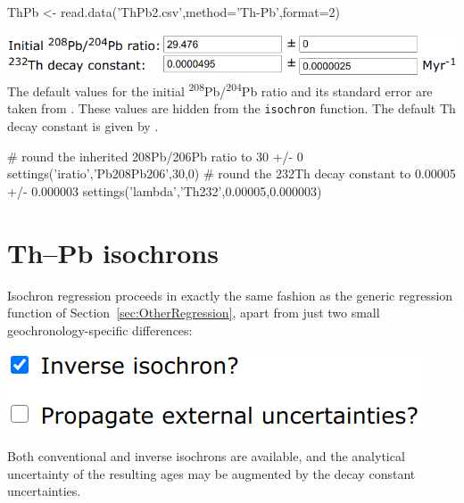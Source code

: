 \begin{refsection}
\begin{script}
ThPb <- read.data('ThPb2.csv',method='Th-Pb',format=2)
\end{script}

\noindent\includegraphics[width=.7\linewidth]{../figures/ThPbLambda.png}\\
\noindent The default values for the initial
\textsuperscript{208}Pb/\textsuperscript{204}Pb ratio and its standard
error are taken from \citet{stacey1975}. These values are hidden from
the \texttt{isochron} function. The default Th decay constant is given
by \citet{leroux1963}.

\begin{script}
# round the inherited 208Pb/206Pb ratio to 30 +/- 0
settings('iratio','Pb208Pb206',30,0) 
# round the 232Th decay constant to 0.00005 +/- 0.000003
settings('lambda','Th232',0.00005,0.000003) 
\end{script}

\section{Th--Pb isochrons}\label{sec:ThPb-isochrons-R}

Isochron regression proceeds in exactly the same fashion as the
generic regression function of Section~\ref{sec:OtherRegression},
apart from just two small geochronology-specific differences:\\

\noindent\begin{minipage}[t]{.35\linewidth}
\strut\vspace*{-\baselineskip}\newline
\includegraphics[width=\linewidth]{../figures/ThPbInverseExterr.png}
\end{minipage}
\begin{minipage}[t]{.65\linewidth}
Both conventional and inverse isochrons are available, and the
analytical uncertainty of the resulting ages may be augmented by the
decay constant uncertainties.\\
\end{minipage}


\end{refsection}
